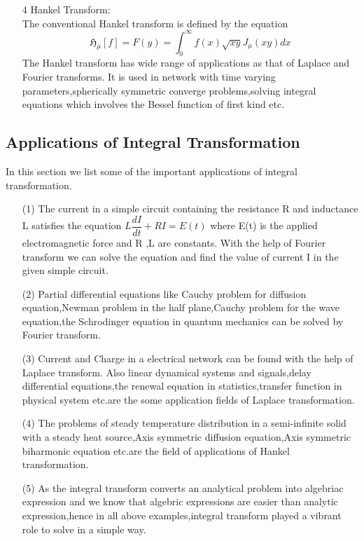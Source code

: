 \begin{large}
\begin{itemize}
\item[4]Hankel Transform:\\
The conventional Hankel transform is defined by the equation
\begin{equation*}
\mathfrak{H_{\mu}}[f]=F(y)=\int_{0}^{\infty}f(x)\sqrt{xy}J_{\mu}{(xy)}dx
\end{equation*}
The Hankel transform has wide range of applications as that of Laplace and Fourier transforms. It is used in network with time varying parameters,spherically symmetric converge problems,solving integral equations which involves the Bessel function of first kind etc.
\end{itemize}
\subsection{Applications of Integral Transformation}
In this section we list some of the important applications of integral transformation.
\begin{itemize}
\item[(1)]The current in a simple circuit containing the resistance R and inductance L satisfies the equation $L\dfrac{dI}{dt}+RI = E(t)$ where E(t) is the applied electromagnetic force and R ,L are constants. With the help of Fourier transform we can solve the equation and find the value of current I in the given simple circuit.
\item[(2)]Partial differential equations like Cauchy problem for diffusion equation,Newman problem in the half plane,Cauchy problem for the wave equation,the Schrodinger equation in quantum mechanics can be solved by Fourier transform.
\item[(3)]Current and Charge in a electrical network can be found with the help of Laplace transform. Also linear dynamical systems and signals,delay differential equations,the renewal equation in statistics,transfer function in physical system etc.are the some application fields of Laplace transformation.
\item[(4)]The problems of steady temperature distribution in a semi-infinite solid with a steady heat source,Axis symmetric diffusion equation,Axis symmetric biharmonic equation etc.are the field of applications of Hankel transformation. 
\item[(5)]As the integral transform converts an analytical problem into algebriac expression and we know that algebric expressions are easier than analytic expression,hence in all above examples,integral transform played a vibrant role to solve in a simple way.
\end{itemize}


\end{large}
